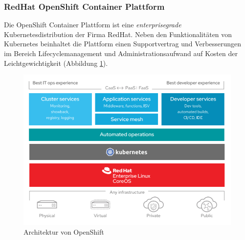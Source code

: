 \documentclass[a4paper,11pt]{article}
\begin{document}
      \subsubsection{RedHat OpenShift Container Plattform}
      Die OpenShift Container Plattform ist eine \textit{enterprisegrade} Kubernetesdistribution der Firma RedHat. Neben den
      Funktionalitäten von Kubernetes beinhaltet die Plattform einen Supportvertrag und Verbesserungen im Bereich 
      Lifecyclemanagement und Administrationsaufwand auf Kosten der Leichtgewichtigkeit (Abbildung \ref{fig:openshift_arch}).
      \begin{figure}[!ht]
        \includegraphics[width=\linewidth]{assets/openshift.png}
        \caption{Architektur von OpenShift}
        \label{fig:openshift_arch}
      \end{figure}
\end{document}
